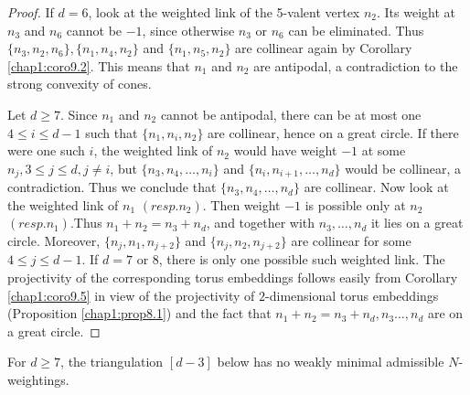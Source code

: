 \begin{proof}
If $d=6$, look at the weighted link of the 5-valent vertex
$n_2$. Its weight at $n_3$ and $n_6$ cannot be $-1$, since otherwise
$n_3$ or $n_6$ can be eliminated. Thus $\{n_3, n_2, n_6 \}, \{n_1,
n_4, n_2\}$ and $\{n_1, n_5, n_2\}$ are collinear again by Corollary
\ref{chap1:coro9.2}. This means that $n_1$ and $n_2$ are antipodal, a
contradiction 
to the strong convexity of cones. 

Let $d \geq 7$. Since $n_1$ and $n_2$ cannot be antipodal, there can
be at most one $4 \leq i \leq d- 1$ such that $\{ n_1, n_i, n_2\}$ are
collinear, hence on a great circle. If there were one such $i$, the
weighted link of $n_2$ would have weight $-1$ at some $n_j, 3 \leq j
\leq d,  j \neq i$, but $\{ n_3, n_4, \ldots, n_i\}$ and $\{n_i,
n_{i+1}, \ldots , n_d\}$ would be collinear, a contradiction. Thus we
conclude that $\{n_3, n_4, \ldots , n_d\}$ are collinear. Now look at
the weighted link of $n_1$ $(resp. n_2)$. Then weight $-1$ is possible
only at $n_2$ $(resp. n_1)$.\pageoriginale Thus $n_1 +  n_2=n_3 +n_d$,
and together 
with $n_3, \ldots , n_d$ it lies on a great circle. Moreover, $\{ n_j,
n_1, n_{j+2}\}$ and $\{ n_j, n_2, n_{j+2}\}$ are collinear for some $4
\leq j \leq d- 1$. If $d= 7$ or $8$, there is only one possible such
weighted link. The projectivity of the corresponding torus embeddings
follows easily from Corollary \ref{chap1:coro9.5} in view of the projectivity of
$2$-dimensional torus embeddings (Proposition \ref{chap1:prop8.1}) and
the fact that 
$n_1 + n_2 =n_3 +n_d, n_3 \ldots , n_d$ are on a great circle. 
\end{proof}


\begin{lemma}[Nagaya]\label{chap1:lem9.9}
 For $d \geq 7$, the triangulation $[d-3]$ below has no weakly
  minimal admissible $N$-weightings. 
\end{lemma}

